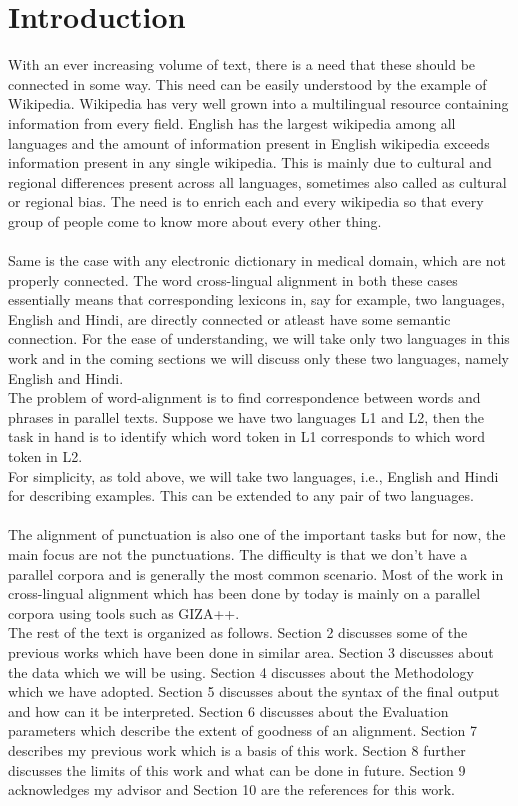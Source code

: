 \documentclass{article}
\begin{document}
\section{Introduction}
With an ever increasing volume of text, there is a need that these should be connected in some way. This need can be easily understood by the example of Wikipedia. Wikipedia has very well grown into a multilingual resource containing information from every field. English has the largest wikipedia among all languages and the amount of information present in English wikipedia exceeds information present in any single wikipedia. This is mainly due to cultural and regional differences present across all languages, sometimes also called as cultural or regional bias. The need is to enrich each and every wikipedia so that every group of people come to know more about every other thing.\\\\
Same is the case with any electronic dictionary in medical domain, which are not properly connected. The word cross-lingual alignment in both these cases essentially means that corresponding lexicons in, say for example, two languages, English and Hindi, are directly connected or atleast have some semantic connection. For the ease of understanding, we will take only two languages in this work and in the coming sections we will discuss only these two languages, namely English and Hindi. \\
The problem of word-alignment is to find correspondence between words and phrases in parallel texts. Suppose we have two languages L1 and L2, then the task in hand is to identify which word token in L1 corresponds to which word token in L2.\\
For simplicity, as told above, we will take two languages, i.e., English and Hindi for describing examples. This can be extended to any pair of two languages.\\\\
The alignment of punctuation is also one of the important tasks but for now, the main focus are not the punctuations.
The difficulty is that we don't have a parallel corpora and is generally the most common scenario. Most of the work in cross-lingual alignment which has been done by today is mainly on a parallel corpora using tools such as GIZA++.\\
The rest of the text is organized as follows. Section 2 discusses some of the previous works which have been done in similar area. Section 3 discusses about the data which we will be using. Section 4 discusses about the Methodology which we have adopted. Section 5 discusses about the syntax of the final output and how can it be interpreted. Section 6 discusses about the Evaluation parameters which describe the extent of goodness of an alignment. Section 7 describes my previous work which is a basis of this work. Section 8 further discusses the limits of this work and what can be done in future. Section 9 acknowledges my advisor and Section 10 are the references for this work.
\end{document}
